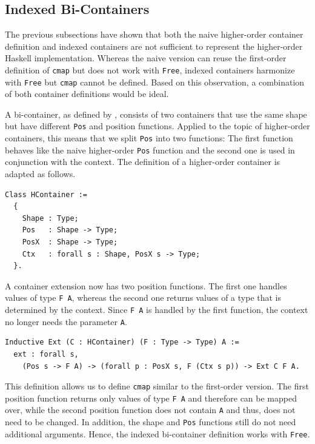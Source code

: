 \documentclass[a4paper, 11pt, fleqn, twoside, abstract=on]{scrreprt}
\newcommand{\cinl}[1]{\texttt{#1}}
\begin{document}
\subsection{Indexed Bi-Containers}
The previous subsections have shown that both the naive higher-order container definition and indexed containers are not sufficient to represent the higher-order Haskell implementation.
Whereas the naive version can reuse the first-order definition of \cinl{cmap} but does not work with \cinl{Free}, indexed containers harmonize with \cinl{Free} but \cinl{cmap} cannot be defined.
Based on this observation, a combination of both container definitions would be ideal.

A bi-container, as defined by \citet{ghani2007higherDimensional}, consists of two containers that use the same shape but have different \cinl{Pos} and position functions.
Applied to the topic of higher-order containers, this means that we split \cinl{Pos} into two functions: The first function behaves like the naive higher-order \cinl{Pos} function and the second one is used in conjunction with the context.
The definition of a higher-order container is adapted as follows.

\begin{verbatim}
Class HContainer :=
  {
    Shape : Type;
    Pos   : Shape -> Type;
    PosX  : Shape -> Type;
    Ctx   : forall s : Shape, PosX s -> Type;
  }.
\end{verbatim}

A container extension now has two position functions.
The first one handles values of type \cinl{F A}, whereas the second one returns values of a type that is determined by the context.
Since \cinl{F A} is handled by the first function, the context no longer needs the parameter \cinl{A}.

\begin{verbatim}
Inductive Ext (C : HContainer) (F : Type -> Type) A :=
  ext : forall s, 
    (Pos s -> F A) -> (forall p : PosX s, F (Ctx s p)) -> Ext C F A.
\end{verbatim}

This definition allows us to define \cinl{cmap} similar to the first-order version.
The first position function returns only values of type \cinl{F A} and therefore can be mapped over, while the second position function does not contain \cinl{A} and thus, does not need to be changed.
In addition, the shape and \cinl{Pos} functions still do not need additional arguments.
Hence, the indexed bi-container definition works with \cinl{Free}.
\end{document}
